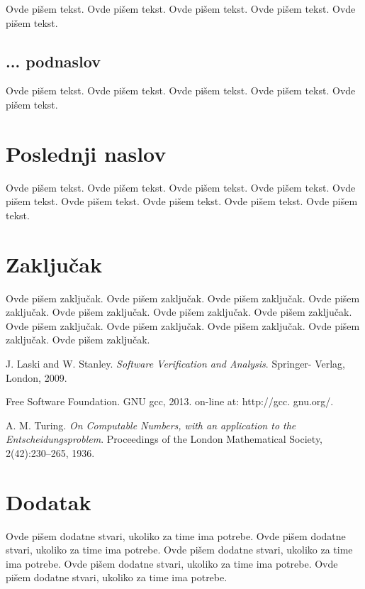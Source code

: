 \documentclass[a4paper]{article}
\begin{document}
Ovde pišem tekst. 
Ovde pišem tekst. 
Ovde pišem tekst. 
Ovde pišem tekst. 
Ovde pišem tekst. 

\subsection{... podnaslov}
\label{subsec:podnaslovM}

Ovde pišem tekst. 
Ovde pišem tekst. 
Ovde pišem tekst. 
Ovde pišem tekst. 
Ovde pišem tekst. 

\section{Poslednji naslov}
\label{sec:naslovM}

Ovde pišem tekst. 
Ovde pišem tekst. 
Ovde pišem tekst. 
Ovde pišem tekst. 
Ovde pišem tekst. 
Ovde pišem tekst. 
Ovde pišem tekst. 
Ovde pišem tekst. 
Ovde pišem tekst. 

\section{Zaključak}
\label{sec:zakljucak}

Ovde pišem zaključak. 
Ovde pišem zaključak. 
Ovde pišem zaključak. 
Ovde pišem zaključak. 
Ovde pišem zaključak. 
Ovde pišem zaključak. 
Ovde pišem zaključak. 
Ovde pišem zaključak. 
Ovde pišem zaključak. 
Ovde pišem zaključak. 
Ovde pišem zaključak. 
Ovde pišem zaključak. 


\appendix

\iffalse
 

\fi

\begin{thebibliography}{9}

 J. Laski and W. Stanley. \emph{Software Verification and Analysis}. Springer- Verlag, London, 2009.

 Free Software Foundation. GNU gcc, 2013. on-line at: http://gcc. gnu.org/.

 A. M. Turing. \emph{On Computable Numbers, with an application to the Entscheidungsproblem}. Proceedings of the London Mathematical Society, 2(42):230–265, 1936.


\end{thebibliography}


\appendix
\section{Dodatak}
Ovde pišem dodatne stvari, ukoliko za time ima potrebe.
Ovde pišem dodatne stvari, ukoliko za time ima potrebe.
Ovde pišem dodatne stvari, ukoliko za time ima potrebe.
Ovde pišem dodatne stvari, ukoliko za time ima potrebe.
Ovde pišem dodatne stvari, ukoliko za time ima potrebe.
\end{document}

